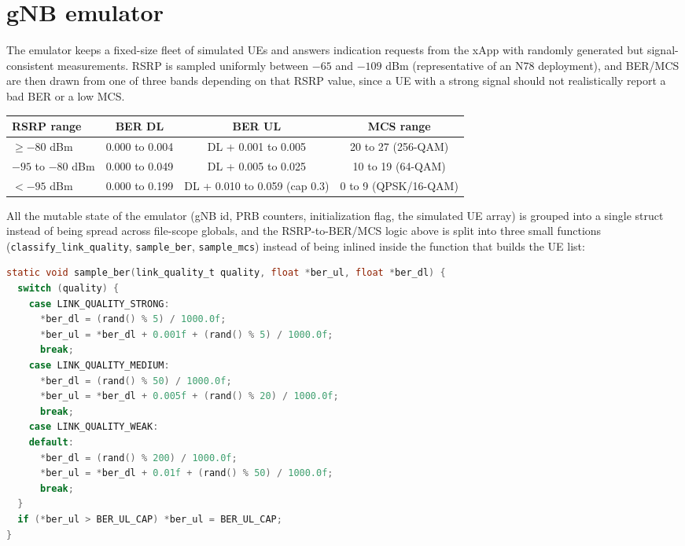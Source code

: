 \documentclass[11pt]{article}
\begin{document}
\section{gNB emulator}
The emulator keeps a fixed-size fleet of simulated UEs and answers indication requests from the xApp with randomly generated but signal-consistent measurements. RSRP is sampled uniformly between $-65$ and $-109$ dBm (representative of an N78 deployment), and BER/MCS are then drawn from one of three bands depending on that RSRP value, since a UE with a strong signal should not realistically report a bad BER or a low MCS.

\begin{center}
\small
\begin{tabular}{lccc}
\toprule
RSRP range & BER DL & BER UL & MCS range \\
\midrule
$\geq -80$ dBm & 0.000 to 0.004 & DL + 0.001 to 0.005 & 20 to 27 (256-QAM) \\
$-95$ to $-80$ dBm & 0.000 to 0.049 & DL + 0.005 to 0.025 & 10 to 19 (64-QAM) \\
$< -95$ dBm & 0.000 to 0.199 & DL + 0.010 to 0.059 (cap 0.3) & 0 to 9 (QPSK/16-QAM) \\
\bottomrule
\end{tabular}
\end{center}

All the mutable state of the emulator (gNB id, PRB counters, initialization flag, the simulated UE array) is grouped into a single struct instead of being spread across file-scope globals, and the RSRP-to-BER/MCS logic above is split into three small functions (\texttt{classify\_link\_quality}, \texttt{sample\_ber}, \texttt{sample\_mcs}) instead of being inlined inside the function that builds the UE list:

\begin{lstlisting}[language=C]
static void sample_ber(link_quality_t quality, float *ber_ul, float *ber_dl) {
  switch (quality) {
    case LINK_QUALITY_STRONG:
      *ber_dl = (rand() % 5) / 1000.0f;
      *ber_ul = *ber_dl + 0.001f + (rand() % 5) / 1000.0f;
      break;
    case LINK_QUALITY_MEDIUM:
      *ber_dl = (rand() % 50) / 1000.0f;
      *ber_ul = *ber_dl + 0.005f + (rand() % 20) / 1000.0f;
      break;
    case LINK_QUALITY_WEAK:
    default:
      *ber_dl = (rand() % 200) / 1000.0f;
      *ber_ul = *ber_dl + 0.01f + (rand() % 50) / 1000.0f;
      break;
  }
  if (*ber_ul > BER_UL_CAP) *ber_ul = BER_UL_CAP;
}
\end{lstlisting}
\end{document}
